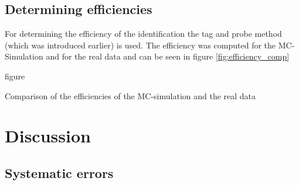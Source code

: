 \documentclass[12pt, a4paper, bibliography=totoc]{scrartcl}
\begin{document}
\begin{multicols}{2}
\subsection{Determining efficiencies}
For determining the efficiency of the identification the tag and probe method (which was introduced earlier) is used.
The efficiency was computed for the MC-Simulation and for the real data and can be seen in figure \ref{fig:efficiency_comp}

\begin{center}
    \caption{figure}{Comparison of the efficiencies of the MC-simulation and the real data}
    \label{fig:efficiency_comp}
\end{center}


\section{Discussion}

\subsection{Systematic errors}

\section{}

\nocite{*}
\appendix
\printbibliography
\end{multicols}
\end{document}
